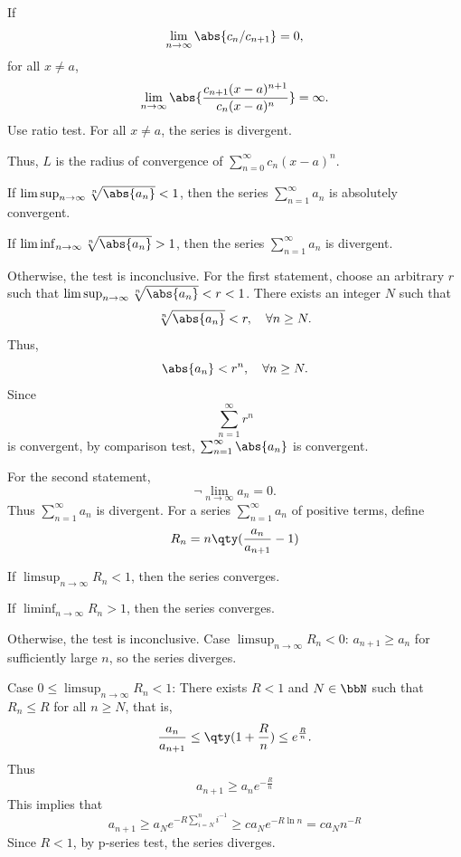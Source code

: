 If
\[\lim_{n\to\infty}\abs{c_n/c_{n+1}}=0,\]
for all $x\ne a$,
\[\lim_{n\to\infty}\abs{\frac{c_{n+1}(x-a)^{n+1}}{c_n(x-a)^n}}=\infty.\]
Use ratio test. For all $x\ne a$, the series is divergent.

Thus, $L$ is the radius of convergence of $\sum_{n=0}^{\infty}c_n(x-a)^n$.
\epr
{}
\ben
\item If $\limsup_{n\to\infty}\sqrt[n]{\abs{a_n}}<1$, then the series $\sum_{n=1}^{\infty}a_n$ is absolutely convergent.
\item If $\liminf_{n\to\infty}\sqrt[n]{\abs{a_n}}>1$, then the series $\sum_{n=1}^{\infty}a_n$ is divergent.
\item Otherwise, the test is inconclusive.
\een
\bpr
For the first statement, choose an arbitrary $r$ such that $\limsup_{n\to\infty}\sqrt[n]{\abs{a_n}}<r<1$. There exists an integer $N$ such that
\[\sqrt[n]{\abs{a_n}}<r,\quad\forall n\geq N.\]
Thus,
\[\abs{a_n}<r^n,\quad\forall n\geq N.\]
Since
\[\sum_{n=1}^{\infty}r^n\]
is convergent, by comparison test, $\sum_{n=1}^{\infty}\abs{a_n}$ is convergent.

For the second statement,
\[\neg\lim_{n\to\infty}a_n=0.\]
Thus $\sum_{n=1}^{\infty}a_n$ is divergent.
\epr
{}
For a series $\sum_{n=1}^{\infty}a_n$ of positive terms, define
\[R_n=n\qty(\frac{a_n}{a_{n+1}}-1)\]
\bit
\item If $\limsup_{n\to\infty}R_n<1$, then the series converges.
\item If $\liminf_{n\to\infty}R_n>1$, then the series converges.
\item Otherwise, the test is inconclusive.
\eit
\bpr
Case $\limsup_{n\to\infty}R_n<0$: $a_{n+1}\ge a_n$ for sufficiently large $n$, so the series diverges.

Case $0\le\limsup_{n\to\infty}R_n<1$: There exists $R<1$ and $N\in\bbN$ such that $R_n\le R$ for all $n\ge N$, that is,
\[\frac{a_n}{a_{n+1}}\le\qty(1+\frac{R}{n})\le e^{\frac{R}{n}}.\]
Thus
\[a_{n+1}\ge a_ne^{-\frac{R}{n}}\]
This implies that
\[a_{n+1}\ge a_Ne^{-R\sum_{i=N}^ni^{-1}}\ge ca_Ne^{-R\ln n}=ca_Nn^{-R}\]
Since $R<1$, by p-series test, the series diverges.

